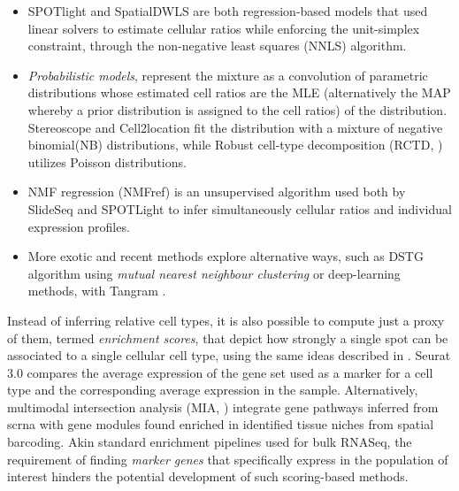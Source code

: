 \begin{itemize}
    \item SPOTlight \autocite{elosua-bayes_etal21} and SpatialDWLS \autocite{dong_yuan21} are both regression-based models that used linear solvers to estimate cellular ratios while enforcing the unit-simplex constraint, through the non-negative least squares (NNLS) algorithm.
    
    \item \textit{Probabilistic models}, represent the mixture as a convolution of parametric distributions whose estimated cell ratios are the MLE (alternatively the MAP whereby a prior distribution is assigned to the cell ratios) of the distribution. Stereoscope \autocite{khozoie_etal21} and Cell2location \autocite{kleshchevnikov_etal20} fit the distribution with a mixture of negative binomial(NB) distributions, while Robust cell-type decomposition (RCTD, \autocite{cable_etal22}) utilizes Poisson distributions. 
    
    \item NMF regression (NMFref) is an unsupervised algorithm used both by SlideSeq \autocite{xu_etal16} and SPOTLight \autocite{gulati_etal13} to infer simultaneously cellular ratios and individual expression profiles.   
       
    \item More exotic and recent methods explore alternative ways, such as DSTG \autocite{he_etal20} algorithm using  \textit{mutual nearest neighbour clustering} or deep-learning methods, with Tangram \autocite{bergenstrahle_etal20}.  
\end{itemize}

Instead of inferring relative cell types, it is also possible to compute just a proxy of them, termed \textit{enrichment scores}, that depict how strongly a single spot can be associated to a single cellular cell type, using the same ideas described in . Seurat 3.0 \autocite{kiselev_etal17} compares the average expression of the gene set used as a marker for a cell type and the corresponding average expression in the sample. Alternatively, multimodal intersection analysis (MIA, \autocite{moncada_etal20}) integrate gene pathways inferred from \acrshort{scrna} with gene modules found enriched in identified tissue niches from spatial barcoding. 
    Akin standard enrichment pipelines used for bulk RNASeq, the requirement of finding \textit{marker genes} that specifically express in the population of interest hinders the potential development of such scoring-based methods. 


